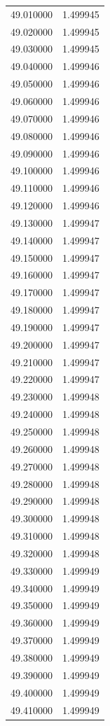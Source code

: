 \begin{tabular}{rr}
49.010000 & 1.499945 \\
49.020000 & 1.499945 \\
49.030000 & 1.499945 \\
49.040000 & 1.499946 \\
49.050000 & 1.499946 \\
49.060000 & 1.499946 \\
49.070000 & 1.499946 \\
49.080000 & 1.499946 \\
49.090000 & 1.499946 \\
49.100000 & 1.499946 \\
49.110000 & 1.499946 \\
49.120000 & 1.499946 \\
49.130000 & 1.499947 \\
49.140000 & 1.499947 \\
49.150000 & 1.499947 \\
49.160000 & 1.499947 \\
49.170000 & 1.499947 \\
49.180000 & 1.499947 \\
49.190000 & 1.499947 \\
49.200000 & 1.499947 \\
49.210000 & 1.499947 \\
49.220000 & 1.499947 \\
49.230000 & 1.499948 \\
49.240000 & 1.499948 \\
49.250000 & 1.499948 \\
49.260000 & 1.499948 \\
49.270000 & 1.499948 \\
49.280000 & 1.499948 \\
49.290000 & 1.499948 \\
49.300000 & 1.499948 \\
49.310000 & 1.499948 \\
49.320000 & 1.499948 \\
49.330000 & 1.499949 \\
49.340000 & 1.499949 \\
49.350000 & 1.499949 \\
49.360000 & 1.499949 \\
49.370000 & 1.499949 \\
49.380000 & 1.499949 \\
49.390000 & 1.499949 \\
49.400000 & 1.499949 \\
49.410000 & 1.499949 \\

\end{tabular}
